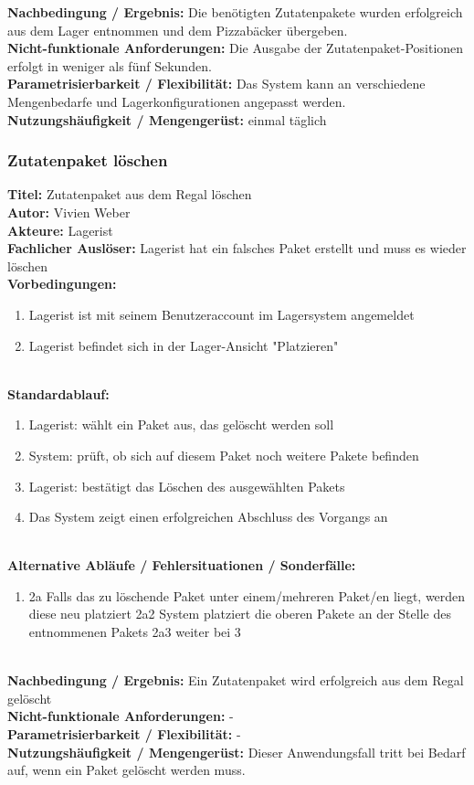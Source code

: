 \textbf{Nachbedingung / Ergebnis:} Die benötigten Zutatenpakete wurden erfolgreich aus dem Lager entnommen und dem Pizzabäcker übergeben.\\
\textbf{Nicht-funktionale Anforderungen:} Die Ausgabe der Zutatenpaket-Positionen erfolgt in weniger als fünf Sekunden.\\
\textbf{Parametrisierbarkeit / Flexibilität:} Das System kann an verschiedene Mengenbedarfe und Lagerkonfigurationen angepasst werden.\\
\textbf{Nutzungshäufigkeit / Mengengerüst:} einmal täglich

\subsubsection{Zutatenpaket löschen}
\label{Zutatenpakete_entnehmen}
\textbf{Titel:} Zutatenpaket aus dem Regal löschen\\
\textbf{Autor:} Vivien Weber\\
\textbf{Akteure:} Lagerist\\
\textbf{Fachlicher Auslöser:} Lagerist hat ein falsches Paket erstellt und muss es wieder löschen\\
\textbf{Vorbedingungen:}
\begin{enumerate}
	\item Lagerist ist mit seinem Benutzeraccount im Lagersystem angemeldet
	\item Lagerist befindet sich in der Lager-Ansicht "Platzieren"
\end{enumerate}\\
\textbf{Standardablauf:}
\begin{enumerate}
	\item Lagerist: wählt ein Paket aus, das gelöscht werden soll
	\item System: prüft, ob sich auf diesem Paket noch weitere Pakete befinden
	\item Lagerist: bestätigt das Löschen des ausgewählten Pakets
	\item Das System zeigt einen erfolgreichen Abschluss des Vorgangs an
\end{enumerate}\\
\textbf{Alternative Abläufe / Fehlersituationen / Sonderfälle:}
\begin{enumerate}
	\item 2a Falls das zu löschende Paket unter einem/mehreren Paket/en liegt, werden diese neu platziert
	\subitem 2a2 System platziert die oberen Pakete an der Stelle des entnommenen Pakets
	\subitem 2a3 weiter bei 3
\end{enumerate}\\
\textbf{Nachbedingung / Ergebnis:} Ein Zutatenpaket wird erfolgreich aus dem Regal gelöscht\\
\textbf{Nicht-funktionale Anforderungen:} -\\
\textbf{Parametrisierbarkeit / Flexibilität:} -\\
\textbf{Nutzungshäufigkeit / Mengengerüst:} Dieser Anwendungsfall tritt bei Bedarf auf, wenn ein Paket gelöscht werden muss.\\

